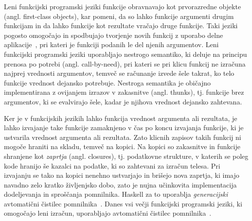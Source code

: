 \documentclass[a4paper, 12pt]{article}
\begin{document}

Leni funkcijski programski jeziki funkcije obravnavajo kot prvorazredne objekte (angl. first-class objects), kar pomeni, da so lahko funkcije argumenti drugim funkcijam in da lahko funkcije kot rezultate vračajo druge funkcije. Taki jeziki pogosto omogočajo in spodbujajo tvorjenje novih funkcij z uporabo delne aplikacije~\cite{10.1145/72551.72554}, pri kateri je funkciji podanih le del njenih argumentov. Leni funkcijski programski jeziki uporabljajo nestrogo semantiko, ki deluje na principu prenosa po potrebi (angl. call-by-need), pri kateri se pri klicu funkcij ne izračuna najprej vrednosti argumentov, temveč se računanje izvede šele takrat, ko telo funkcije vrednost dejansko potrebuje. Nestroga semantika je običajno implementirana z ovijanjem izrazov v zakasnitve (angl. thunks), tj. funkcije brez argumentov, ki se evalvirajo šele, kadar je njihova vrednost dejansko zahtevana.


Ker je v funkcijskih jezikih lahko funkcija vrednost argumenta ali rezultata, je lahko izvajanje take funkcije zamaknjeno v čas po koncu izvajanja funkcije, ki je ustvarila vrednost argumenta ali rezultata. Zato klicnih zapisov takih funkcij ni mogoče hraniti na skladu, temveč na kopici. Na kopici so zakasnitve in funkcije shranjene kot \textit{zaprtja} (angl. closures), tj. podatkovne strukture, v katerih se poleg kode hranijo še kazalci na podatke, ki so zahtevani za izračun telesa. Pri izvajanju se tako na kopici nenehno ustvarjajo in brišejo nova zaprtja, ki imajo navadno zelo kratko življenjsko dobo, zato je nujna učinkovita implementacija dodeljevanja in sproščanja pomnilnika. Haskell za to uporablja \textit{generacijski} avtomatični čistilec pomnilnika~\cite{sansom1993generational, GHC}. Danes vsi večji funkcijski programski jeziki, ki omogočajo leni izračun, uporabljajo avtomatični čistilec pomnilnika~\cite{turner1985miranda, czaplicki2012elm, brus1987clean, syme2017the, sperber2009revised6}.
\end{document}
